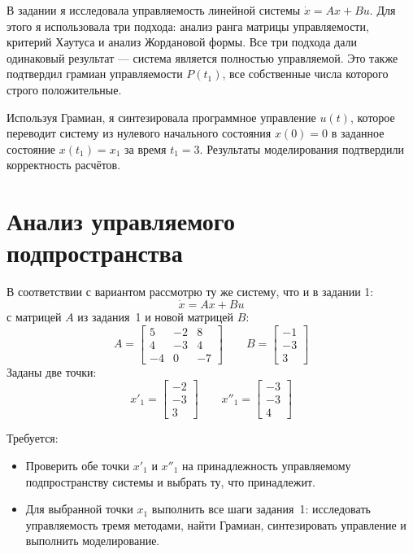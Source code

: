 \documentclass[a4paper,12pt]{article}
\begin{document}
	В задании я исследовала управляемость линейной системы $\dot{x} = Ax + Bu$.
	Для этого я использовала три подхода: анализ ранга матрицы управляемости,
	критерий Хаутуса и анализ Жордановой формы. Все три подхода дали одинаковый
	результат --- система является полностью управляемой. Это также подтвердил
	грамиан управляемости $P(t_1)$, все собственные числа которого строго положительные.
	
	Используя Грамиан, я синтезировала программное управление $u(t)$,
	которое переводит систему из нулевого начального состояния $x(0) = 0$
	в заданное состояние $x(t_1) = x_1$ за время $t_1 = 3$.
	Результаты моделирования подтвердили корректность расчётов.
	
	\newpage
	\section{Анализ управляемого подпространства}
	
	В соответствии с вариантом рассмотрю ту же систему, что и в задании 1:
	\[
	\dot{x} = Ax + Bu
	\]
	с матрицей $A$ из задания~1 и новой матрицей $B$:
	\[
	A = \begin{bmatrix}5&-2&8\\4&-3&4\\-4&0&-7\end{bmatrix} \qquad
	B = \begin{bmatrix}-1\\-3\\3\end{bmatrix}
	\]
	Заданы две точки:
	\[
	x'_1 = \begin{bmatrix}-2\\-3\\3\end{bmatrix} \qquad
	x''_1 = \begin{bmatrix}-3\\-3\\4\end{bmatrix}
	\]
	
	Требуется:
	\begin{itemize}
		\item Проверить обе точки $x'_1$ и $x''_1$ на принадлежность 
		управляемому подпространству системы и выбрать ту, что принадлежит.
		\item Для выбранной точки $x_1$ выполнить все шаги задания~1: 
		исследовать управляемость тремя методами, найти Грамиан, 
		синтезировать управление и выполнить моделирование.
	\end{itemize}
	
\end{document}

